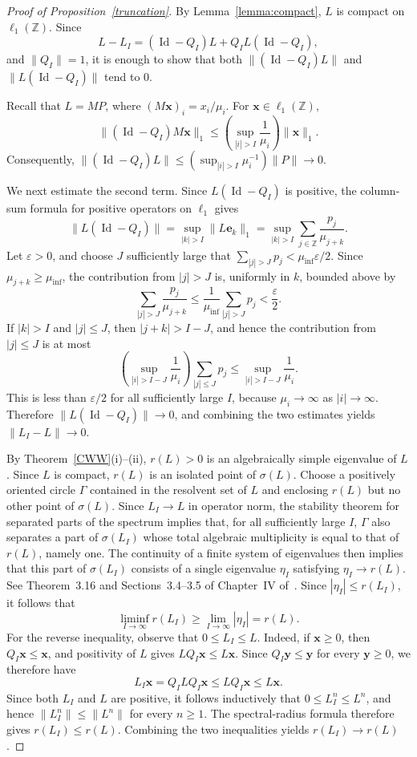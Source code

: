 \documentclass[12pt]{article}
\newcommand{\Z}{\ensuremath{\mathbb Z}}
\newcommand{\muinf}{\ensuremath{\mu_{\inf}}}
\newcommand{\by}{\boldsymbol{y}}
\newcommand{\be}{\boldsymbol{e}}
\newcommand{\Id}{\operatorname{Id}}
\newcommand{\BS}{\ensuremath{\ell_1(\Z)}}
\newcommand{\bx}{\boldsymbol{x}}
\begin{document}
\begin{proof}[Proof of Proposition~\ref{truncation}]
By Lemma~\ref{lemma:compact}, $L$ is compact on $\BS$. Since
$$
L-L_I
=
(\Id-Q_I)L
+
Q_IL(\Id-Q_I),
$$
and $\|Q_I\|=1$, it is enough to show that both
$\|(\Id-Q_I)L\|$ and
$\|L(\Id-Q_I)\|$ tend to $0$.

Recall that $L=MP$, where $(M\bx)_i=x_i/\mu_i$. For $\bx\in\BS$,
$$
\|(\Id-Q_I)M\bx\|_1
\leq
\left(\sup_{|i|>I}\frac1{\mu_i}\right)\|\bx\|_1.
$$
Consequently,
$\|(\Id-Q_I)L\|
\leq(\sup_{|i|>I}\mu_i^{-1})\|P\|\to 0$.

We next estimate the second term. Since
$L(\Id-Q_I)$ is positive, the column-sum formula
for positive operators on $\ell_1$ gives
$$
\|L(\Id-Q_I)\|
=
\sup_{|k|>I}\|L\be_k\|_1
=
\sup_{|k|>I}\sum_{j\in\Z}\frac{p_j}{\mu_{j+k}}.
$$
Let $\varepsilon>0$, and
choose $J$ sufficiently large that
$\sum_{|j|>J}p_j<\muinf\varepsilon/2$. Since
$\mu_{j+k}\geq\muinf$, the contribution from $|j|>J$ is, uniformly in
$k$, bounded above by
$$
\sum_{|j|>J}\frac{p_j}{\mu_{j+k}}
\leq
\frac{1}{\muinf}\sum_{|j|>J}p_j
<
\frac{\varepsilon}{2}.
$$
If $|k|>I$ and $|j|\leq J$, then
$|j+k|>I-J$, and hence the contribution from $|j|\leq J$ is
at most
$$
\left(\sup_{|i|>I-J}\frac1{\mu_i}\right)
\sum_{|j|\leq J}p_j
\leq
\sup_{|i|>I-J}\frac1{\mu_i}.
$$
This is less than $\varepsilon/2$ for all sufficiently large
$I$, because $\mu_i\to\infty$ as $|i|\to\infty$.
Therefore
$\|L(\Id-Q_I)\|\to 0$, and combining the two
estimates yields $\|L_I-L\|\to 0$.

By Theorem~\ref{CWW}(i)--(ii), $r(L)>0$ is an algebraically simple
eigenvalue of $L$. Since $L$ is compact, $r(L)$ is an isolated point of
$\sigma(L)$. Choose a positively oriented circle $\Gamma$ contained in
the resolvent set of $L$ and enclosing $r(L)$ but no other point of
$\sigma(L)$. Since $L_I\to L$ in operator norm, the stability theorem
for separated parts of the spectrum implies that, for all sufficiently
large $I$, $\Gamma$ also separates a part of $\sigma(L_I)$ whose total
algebraic multiplicity is equal to that of $r(L)$, namely one. The
continuity of a finite system of eigenvalues then implies that this part
of $\sigma(L_I)$ consists of a single eigenvalue $\eta_I$ satisfying
$\eta_I\to r(L)$. See Theorem~3.16 and Sections~3.4--3.5 of Chapter~IV
of~\cite{Kato95}. Since $|\eta_I|\leq r(L_I)$, it follows that
$$
\liminf_{I\to\infty}r(L_I) \geq \lim_{I\to\infty}|\eta_I| = r(L).
$$
For the reverse inequality, observe that $0\leq L_I\leq L$. Indeed, if
$\bx\geq0$, then $Q_I\bx\leq\bx$, and positivity of $L$ gives
$LQ_I\bx\leq L\bx$. Since $Q_I\by\leq\by$ for every $\by\geq0$, we
therefore have
$$
L_I\bx = Q_ILQ_I\bx \leq LQ_I\bx \leq L\bx.
$$
Since both $L_I$ and $L$ are positive, it follows inductively that
$0\leq L_I^n\leq L^n$, and hence $\|L_I^n\|\leq\|L^n\|$ for every
$n\geq1$. The spectral-radius formula therefore gives $r(L_I)\leq r(L)$.
Combining the two inequalities yields $r(L_I)\to r(L)$.
\end{proof}
\end{document}
